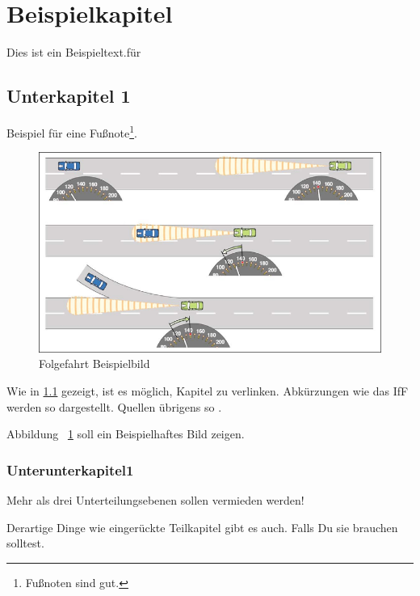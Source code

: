 \section{Beispielkapitel}
Dies ist ein Beispieltext.für

\subsection{Unterkapitel 1}\label{Unterkapitel1Link}
Beispiel für eine Fußnote\footnote{Fußnoten sind gut.}.

\begin{figure}[htbp]
	\centering
	\includegraphics[width=1.0\textwidth]{pics/accBosch.pdf}
	\caption{Folgefahrt Beispielbild}
	\label{fig:accBosch}
\end{figure}

Wie in \ref{Unterkapitel1Link} gezeigt, ist es möglich, Kapitel zu verlinken. Abkürzungen wie das \ac{IfF} werden so dargestellt. Quellen übrigens so \citep{ams09}.

Abbildung ~\ref{fig:accBosch} soll ein Beispielhaftes Bild zeigen.


\subsubsection{Unterunterkapitel1} 

\textbf{} Mehr als drei Unterteilungsebenen sollen vermieden werden!
\par
\begingroup
\leftskip=0.8cm
\noindent \textbf{} Derartige Dinge wie eingerückte Teilkapitel gibt es auch. Falls Du sie brauchen solltest.
\par
\endgroup

